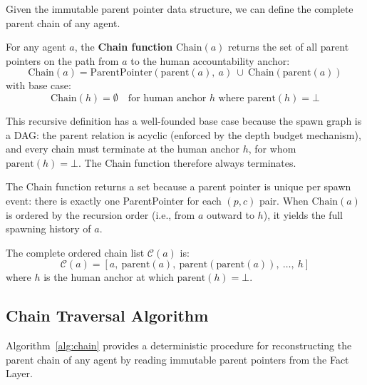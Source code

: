 Given the immutable parent pointer data structure, we can define the complete parent chain of any agent.

\begin{definition}
\label{def:chain-function}
For any agent $a$, the \textbf{Chain function} $\mathrm{Chain}(a)$ returns the set of all parent pointers on the path from $a$ to the human accountability anchor:
\[
\mathrm{Chain}(a) = \mathrm{ParentPointer}(\mathrm{parent}(a),\ a)\ \cup\ \mathrm{Chain}(\mathrm{parent}(a))
\]
with base case:
\[
\mathrm{Chain}(h) = \emptyset \quad\text{for human anchor } h \text{ where } \mathrm{parent}(h) = \bot
\]
\end{definition}

This recursive definition has a well-founded base case because the spawn graph is a DAG: the $\mathrm{parent}$ relation is acyclic (enforced by the depth budget mechanism), and every chain must terminate at the human anchor $h$, for whom $\mathrm{parent}(h) = \bot$. The Chain function therefore always terminates.

The Chain function returns a set because a parent pointer is unique per spawn event: there is exactly one ParentPointer for each $(p, c)$ pair. When $\mathrm{Chain}(a)$ is ordered by the recursion order (i.e., from $a$ outward to $h$), it yields the full spawning history of $a$.

The complete ordered chain list $\mathcal{C}(a)$ is:
\[
\mathcal{C}(a) = [a,\ \mathrm{parent}(a),\ \mathrm{parent}(\mathrm{parent}(a)),\ \ldots,\ h]
\]
where $h$ is the human anchor at which $\mathrm{parent}(h) = \bot$.

\subsection{Chain Traversal Algorithm}

Algorithm~\ref{alg:chain} provides a deterministic procedure for reconstructing the parent chain of any agent by reading immutable parent pointers from the Fact Layer.

